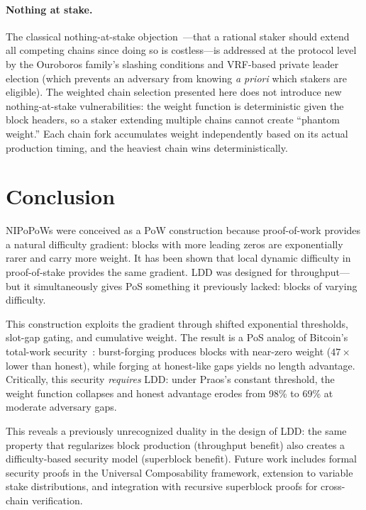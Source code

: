 \documentclass[11pt]{article}
\begin{document}
\paragraph{Nothing at stake.} The classical nothing-at-stake objection~\cite{ouroboros}---that a rational staker should extend all competing chains since doing so is costless---is addressed at the protocol level by the Ouroboros family's slashing conditions and VRF-based private leader election (which prevents an adversary from knowing \emph{a priori} which stakers are eligible). The weighted chain selection presented here does not introduce new nothing-at-stake vulnerabilities: the weight function is deterministic given the block headers, so a staker extending multiple chains cannot create ``phantom weight.'' Each chain fork accumulates weight independently based on its actual production timing, and the heaviest chain wins deterministically.

\section{Conclusion}

NIPoPoWs were conceived as a PoW construction because proof-of-work provides a natural difficulty gradient: blocks with more leading zeros are exponentially rarer and carry more weight. It has been shown that local dynamic difficulty in proof-of-stake provides the same gradient. LDD was designed for throughput---but it simultaneously gives PoS something it previously lacked: blocks of varying difficulty.

This construction exploits the gradient through shifted exponential thresholds, slot-gap gating, and cumulative weight. The result is a PoS analog of Bitcoin's total-work security~\cite{backbone}: burst-forging produces blocks with near-zero weight ($47\times$ lower than honest), while forging at honest-like gaps yields no length advantage. Critically, this security \emph{requires} LDD: under Praos's constant threshold, the weight function collapses and honest advantage erodes from 98\% to 69\% at moderate adversary gaps.

This reveals a previously unrecognized duality in the design of LDD: the same property that regularizes block production (throughput benefit) also creates a difficulty-based security model (superblock benefit). Future work includes formal security proofs in the Universal Composability framework, extension to variable stake distributions, and integration with recursive superblock proofs for cross-chain verification.
\end{document}
